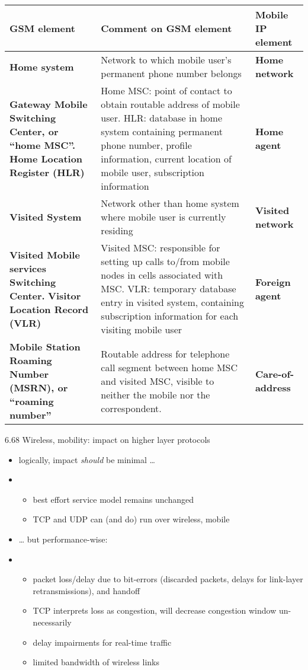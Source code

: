 \documentclass[
]{article}
\begin{document}
\begin{longtable}[]{@{}lll@{}}
\toprule
\textbf{GSM element} & \textbf{Comment on GSM element} & \textbf{Mobile
IP element}\tabularnewline
\midrule
\endhead
\textbf{Home system} & Network to which mobile user's permanent phone
number belongs & \textbf{Home network}\tabularnewline
\textbf{Gateway Mobile Switching Center, or ``home MSC''. Home Location
Register (HLR)} & Home MSC: point of contact to obtain routable address
of mobile user. HLR: database in home system containing permanent phone
number, profile information, current location of mobile user,
subscription information & \textbf{Home agent}\tabularnewline
\textbf{Visited System} & Network other than home system where mobile
user is currently residing & \textbf{Visited network}\tabularnewline
\textbf{Visited Mobile services Switching Center.} \textbf{Visitor
Location Record (VLR)} & Visited MSC: responsible for setting up calls
to/from mobile nodes in cells associated with MSC. VLR: temporary
database entry in visited system, containing subscription information
for each visiting mobile user & \textbf{Foreign agent}\tabularnewline
\textbf{Mobile Station Roaming Number (MSRN), or ``roaming number''} &
Routable address for telephone call segment between home MSC and visited
MSC, visible to neither the mobile nor the correspondent. &
\textbf{Care-of-address}\tabularnewline
\bottomrule
\end{longtable}

6.68 Wireless, mobility: impact on higher layer protocols

\begin{itemize}
\item
  logically, impact \emph{should} be minimal \ldots{}
\item
  \begin{itemize}
  \item
    best effort service model remains unchanged
  \item
    TCP and UDP can (and do) run over wireless, mobile
  \end{itemize}
\item
  \ldots{} but performance-wise:
\item
  \begin{itemize}
  \item
    packet loss/delay due to bit-errors (discarded packets, delays for
    link-layer retransmissions), and handoff
  \item
    TCP interprets loss as congestion, will decrease congestion window
    un-necessarily
  \item
    delay impairments for real-time traffic
  \item
    limited bandwidth of wireless links
  \end{itemize}
\end{itemize}
\end{document}

